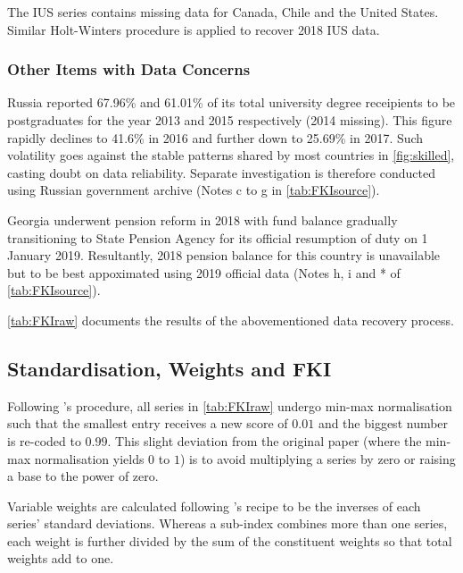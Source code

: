 \documentclass[a4paper,11pt,UKenglish,twoside,openright]{report}\usepackage[]{graphicx}\usepackage[]{color}
\begin{document}

The IUS series contains missing data for Canada, Chile and the United States. Similar Holt-Winters procedure is applied to recover 2018 IUS data.



\subsubsection{Other Items with Data Concerns}

Russia reported 67.96\% and 61.01\% of its total university degree receipients to be postgraduates for the year 2013 and 2015 respectively (2014 missing). This figure rapidly declines to 41.6\% in 2016 and further down to 25.69\% in 2017. Such volatility goes against the stable patterns shared by most countries in \cref{fig:skilled}, casting doubt on data reliability. Separate investigation is therefore conducted using Russian government archive (Notes c to g in \cref{tab:FKIsource}).

Georgia underwent pension reform in 2018 with fund balance gradually transitioning to State Pension Agency for its official resumption of duty on 1 January 2019. Resultantly, 2018 pension balance for this country is unavailable but to be best appoximated using 2019 official data (Notes h, i and * of \cref{tab:FKIsource}).

\cref{tab:FKIraw} documents the results of the abovementioned data recovery process.

\subsection{Standardisation, Weights and FKI}

Following \textcite{olivermarquez:2020}'s procedure, all series in \cref{tab:FKIraw} undergo min-max normalisation such that the smallest entry receives a new score of $0.01$ and the biggest number is re-coded to $0.99$. This slight deviation from the original paper (where the min-max normalisation yields $0$ to $1$) is to avoid multiplying a series by zero or raising a base to the power of zero.

Variable weights are calculated following \textcite{olivermarquez:2020}'s recipe to be the inverses of each series' standard deviations. Whereas a sub-index combines more than one series, each weight is further divided by the sum of the constituent weights so that total weights add to one.
\end{document}
